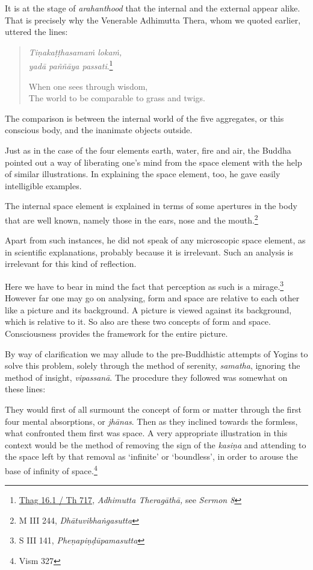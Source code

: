 It is at the stage of \emph{arahanthood} that the internal and the external appear alike. That is precisely why the Venerable Adhimutta Thera, whom we quoted earlier, uttered the lines:

\begin{quote}
\emph{Tiṇakaṭṭhasamaṁ lokaṁ,}\\
\emph{yadā paññāya passati}.\footnote{\href{https://suttacentral.net/thag16.1/pli/ms}{Thag 16.1 / Th 717}, \emph{Adhimutta Theragāthā,} see \emph{Sermon 8}}

When one sees through wisdom,\\
The world to be comparable to grass and twigs.
\end{quote}

The comparison is between the internal world of the five aggregates, or this conscious body, and the inanimate objects outside.

Just as in the case of the four elements earth, water, fire and air, the Buddha pointed out a way of liberating one's mind from the space element with the help of similar illustrations. In explaining the space element, too, he gave easily intelligible examples.

The internal space element is explained in terms of some apertures in the body that are well known, namely those in the ears, nose and the mouth.\footnote{M III 244, \emph{Dhātuvibhaṅgasutta}}

Apart from such instances, he did not speak of any microscopic space element, as in scientific explanations, probably because it is irrelevant. Such an analysis is irrelevant for this kind of reflection.

Here we have to bear in mind the fact that perception as such is a mirage.\footnote{S III 141, \emph{Pheṇapiṇḍūpamasutta}} However far one may go on analysing, form and space are relative to each other like a picture and its background. A picture is viewed against its background, which is relative to it. So also are these two concepts of form and space. Consciousness provides the framework for the entire picture.

By way of clarification we may allude to the pre-Buddhistic attempts of Yogins to solve this problem, solely through the method of serenity, \emph{samatha}, ignoring the method of insight, \emph{vipassanā}. The procedure they followed was somewhat on these lines:

They would first of all surmount the concept of form or matter through the first four mental absorptions, or \emph{jhānas}. Then as they inclined towards the formless, what confronted them first was space. A very appropriate illustration in this context would be the method of removing the sign of the \emph{kasiṇa} and attending to the space left by that removal as `infinite' or `boundless', in order to arouse the base of infinity of space.\footnote{Vism 327}

